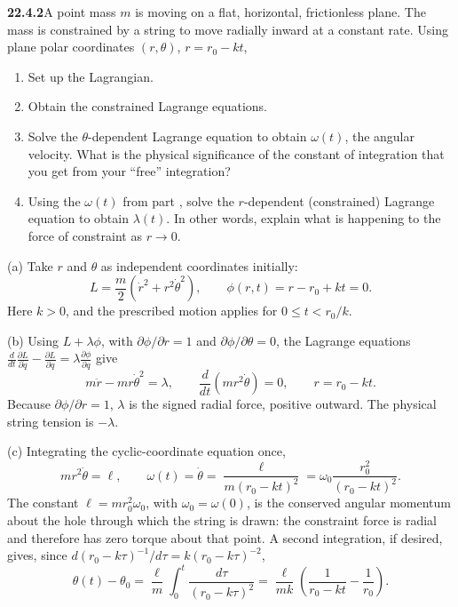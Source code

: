 \par\bigskip
\noindent\textbf{22.4.2}\quad A point mass $m$ is moving on a
flat, horizontal, frictionless plane. The mass is constrained by
a string to move radially inward at a constant rate. Using plane
polar coordinates $(r,\theta)$, $r=r_{0}-kt$,
\begin{enumerate}
\item[(a)] Set up the Lagrangian.
\item[(b)] Obtain the constrained Lagrange equations.
\item[(c)] Solve the $\theta$-dependent Lagrange equation to
obtain $\omega(t)$, the angular velocity. What is the physical
significance of the constant of integration that you get from
your ``free'' integration?
\item[(d)] Using the $\omega(t)$ from part , solve the
$r$-dependent (constrained) Lagrange equation to obtain
$\lambda(t)$. In other words, explain what is happening to the
force of constraint as $r\to0$.
\end{enumerate}
\solution
(a) Take $r$ and $\theta$ as independent coordinates initially:
\[
 L=\frac m2(\dot r^2+r^2\dot\theta^2),\qquad
 \phi(r,t)=r-r_0+kt=0.
\]
Here $k>0$, and the prescribed motion applies for $0\le t<r_0/k$.

(b) Using $L+\lambda\phi$, with $\partial\phi/\partial r=1$ and
$\partial\phi/\partial\theta=0$, the Lagrange equations
$\frac d{dt}\frac{\partial L}{\partial\dot q}-\frac{\partial L}{\partial q}
=\lambda\frac{\partial\phi}{\partial q}$ give
\[
 \boxed{m\ddot r-mr\dot\theta^2=\lambda},\qquad
 \boxed{\frac{d}{dt}(mr^2\dot\theta)=0},\qquad r=r_0-kt.
\]
Because $\partial\phi/\partial r=1$, $\lambda$ is the signed radial
force, positive outward.  The physical string tension is $-\lambda$.

(c) Integrating the cyclic-coordinate equation once,
\[
 mr^2\dot\theta=\ell,\qquad
 \boxed{\omega(t)=\dot\theta=\frac{\ell}{m(r_0-kt)^2}
 =\omega_0\frac{r_0^2}{(r_0-kt)^2}}.
\]
The constant $\ell=mr_0^2\omega_0$, with $\omega_0=\omega(0)$, is the
conserved angular momentum about the hole through which the string is
drawn: the constraint force is radial and therefore has zero torque
about that point.
A second integration, if desired, gives, since
$d(r_0-k\tau)^{-1}/d\tau=k(r_0-k\tau)^{-2}$,
\[
 \theta(t)-\theta_0
 =\frac{\ell}{m}\int_0^t\frac{d\tau}{(r_0-k\tau)^2}
 =\frac{\ell}{mk}\left(\frac1{r_0-kt}-\frac1{r_0}\right).
\]

